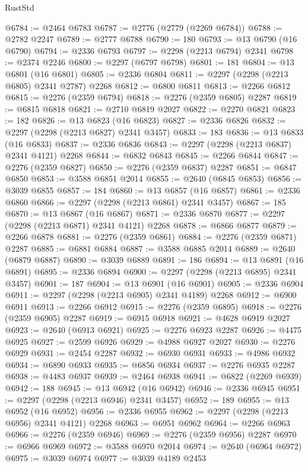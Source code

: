 \begin{lexlean}{RustStd}
\begin{coremodule}
@6784 := @2464 @6783
@6787 := @2776 (@2779 (@2269 @6784))
@6788 := @2782 @2247
@6789 := @2777 @6788
@6790 := 180
@6793 := @13 @6790 (@16 @6790)
@6794 := @2336 @6793
@6797 := @2298 (@2213 @6794) @2341
@6798 := @2374 @2246
@6800 := @2297 (@6797 @6798)
@6801 := 181
@6804 := @13 @6801 (@16 @6801)
@6805 := @2336 @6804
@6811 := @2297 (@2298 (@2213 @6805) @2341 @2787) @2268
@6812 := @6800 @6811
@6813 := @2266 @6812
@6815 := @2276 (@2359 @6794)
@6818 := @2276 (@2359 @6805) @2287
@6819 := @6815 @6818
@6821 := @2710 @6819 @2027
@6822 := @2270 @6821
@6823 := 182
@6826 := @13 @6823 (@16 @6823)
@6827 := @2336 @6826
@6832 := @2297 (@2298 (@2213 @6827) @2341 @3457)
@6833 := 183
@6836 := @13 @6833 (@16 @6833)
@6837 := @2336 @6836
@6843 := @2297 (@2298 (@2213 @6837) @2341 @4121) @2268
@6844 := @6832 @6843
@6845 := @2266 @6844
@6847 := @2276 (@2359 @6827)
@6850 := @2276 (@2359 @6837) @2287
@6851 := @6847 @6850
@6853 := @3588 @6851 @2014
@6855 := @2640 (@6845 @6853)
@6856 := @3039 @6855
@6857 := 184
@6860 := @13 @6857 (@16 @6857)
@6861 := @2336 @6860
@6866 := @2297 (@2298 (@2213 @6861) @2341 @3457)
@6867 := 185
@6870 := @13 @6867 (@16 @6867)
@6871 := @2336 @6870
@6877 := @2297 (@2298 (@2213 @6871) @2341 @4121) @2268
@6878 := @6866 @6877
@6879 := @2266 @6878
@6881 := @2276 (@2359 @6861)
@6884 := @2276 (@2359 @6871) @2287
@6885 := @6881 @6884
@6887 := @3588 @6885 @2014
@6889 := @2640 (@6879 @6887)
@6890 := @3039 @6889
@6891 := 186
@6894 := @13 @6891 (@16 @6891)
@6895 := @2336 @6894
@6900 := @2297 (@2298 (@2213 @6895) @2341 @3457)
@6901 := 187
@6904 := @13 @6901 (@16 @6901)
@6905 := @2336 @6904
@6911 := @2297 (@2298 (@2213 @6905) @2341 @4189) @2268
@6912 := @6900 @6911
@6913 := @2266 @6912
@6915 := @2276 (@2359 @6895)
@6918 := @2276 (@2359 @6905) @2287
@6919 := @6915 @6918
@6921 := @4628 @6919 @2027
@6923 := @2640 (@6913 @6921)
@6925 := @2276 @6923 @2287
@6926 := @4475 @6925
@6927 := @2599 @6926
@6929 := @4988 @6927 @2027
@6930 := @2276 @6929
@6931 := @2454 @2287
@6932 := @6930 @6931
@6933 := @4986 @6932
@6934 := @6890 @6933
@6935 := @6856 @6934
@6937 := @2276 @6935 @2287
@6938 := @4483 @6937
@6939 := @2464 @6938
@6941 := @6822 (@2269 @6939)
@6942 := 188
@6945 := @13 @6942 (@16 @6942)
@6946 := @2336 @6945
@6951 := @2297 (@2298 (@2213 @6946) @2341 @3457)
@6952 := 189
@6955 := @13 @6952 (@16 @6952)
@6956 := @2336 @6955
@6962 := @2297 (@2298 (@2213 @6956) @2341 @4121) @2268
@6963 := @6951 @6962
@6964 := @2266 @6963
@6966 := @2276 (@2359 @6946)
@6969 := @2276 (@2359 @6956) @2287
@6970 := @6966 @6969
@6972 := @3588 @6970 @2014
@6974 := @2640 (@6964 @6972)
@6975 := @3039 @6974
@6977 := @3039 @4189 @2453

\end{coremodule}
\end{lexlean}
